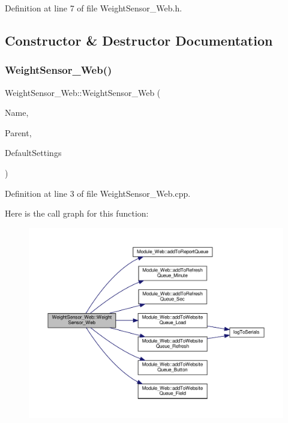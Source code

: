 Definition at line 7 of file Weight\+Sensor\+\_\+\+Web.\+h.



\subsection{Constructor \& Destructor Documentation}
\mbox{\label{class_weight_sensor___web_a8528c52192e9e5c4859ce61099dd9c33}} 
\subsubsection{\texorpdfstring{Weight\+Sensor\+\_\+\+Web()}{WeightSensor\_Web()}}
{\footnotesize\ttfamily Weight\+Sensor\+\_\+\+Web\+::\+Weight\+Sensor\+\_\+\+Web (\begin{DoxyParamCaption}\item[{const \+\_\+\+\_\+\+Flash\+String\+Helper $\ast$}]{Name,  }\item[{\hyperlink{class_module___web}{Module\+\_\+\+Web} $\ast$}]{Parent,  }\item[{\hyperlink{struct_settings_1_1_weight_sensor_settings}{Settings\+::\+Weight\+Sensor\+Settings} $\ast$}]{Default\+Settings }\end{DoxyParamCaption})}



Definition at line 3 of file Weight\+Sensor\+\_\+\+Web.\+cpp.

Here is the call graph for this function\+:
\nopagebreak
\begin{figure}[H]
\begin{center}
\leavevmode
\includegraphics[width=350pt]{class_weight_sensor___web_a8528c52192e9e5c4859ce61099dd9c33_cgraph}
\end{center}
\end{figure}



